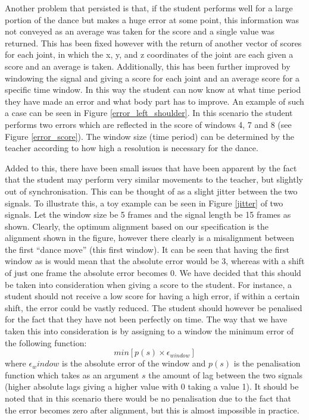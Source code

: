 \documentclass[10pt,a4paper]{article}
\begin{document}
\noindent
Another problem that persisted is that, if the student performs well for a large portion of the dance but makes a huge error at some point, this information was not conveyed as an average was taken for the score and a single value was returned. This has been fixed however with the return of another vector of scores for each joint, in which the x, y, and z coordinates of the joint are each given a score and an average is taken. Additionally, this has been further improved by windowing the signal and giving a score for each joint and an average score for a specific time window. In this way the student can now know at what time period they have made an error and what body part has to improve. An example of such a case can be seen in Figure \ref{error_left_shoulder}. In this scenario the student performs two errors which are reflected in the score of windows 4, 7 and 8 (see Figure \ref{error_score}). The window size (time period) can be determined by the teacher according to how high a resolution is necessary for the dance.
 
\noindent
Added to this, there have been small issues that have been apparent by the fact that the student may perform very similar movements to the teacher, but slightly out of synchronisation. This can be thought of as a slight jitter between the two signals. To illustrate this, a toy example can be seen in Figure \ref{jitter} of two signals. Let the window size be 5 frames and the signal length be 15 frames as shown. Clearly, the optimum alignment based on our specification is the alignment shown in the figure, however there clearly is a misalignment between the first ``dance move'' (this first window). It can be seen that having the first window as is would mean that the absolute error would be 3, whereas with a shift of just one frame the absolute error becomes 0. We have decided that this should be taken into consideration when giving a score to the student. For instance, a student should not receive a low score for having a high error, if within a certain shift, the error could be vastly reduced. The student should however be penalised for the fact that they have not been perfectly on time. The way that we have taken this into consideration is by assigning to a window the minimum error of the following function:
\begin{equation}
min\left[p(s) \times \epsilon_{window}\right]
\end{equation}
where $\epsilon_window$ is the absolute error of the window and $p(s)$ is the penalisation function which takes as an argument $s$ the amount of lag between the two signals (higher absolute lags giving a higher value with 0 taking a value 1). It should be noted that in this scenario there would be no penalisation due to the fact that the error becomes zero after alignment, but this is almost impossible in practice. 
\end{document}
